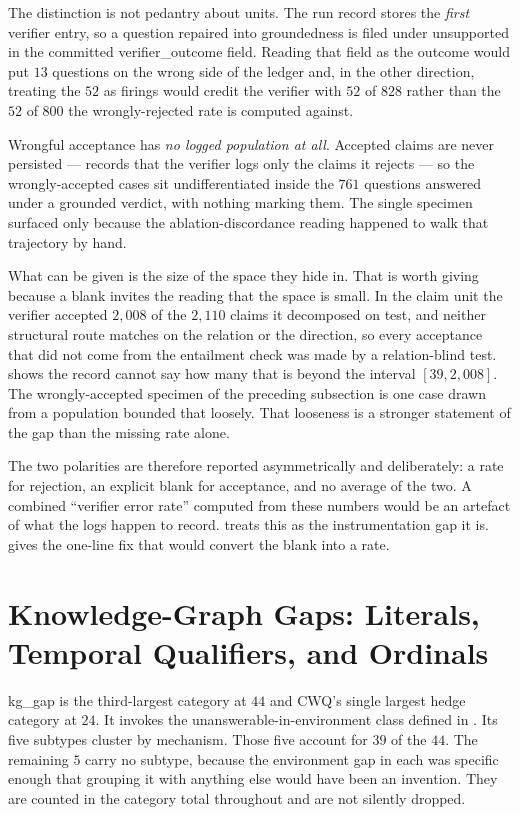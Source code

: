 The distinction is not pedantry about units. The run record stores the
\emph{first} verifier entry, so a question repaired into groundedness is filed
under \textsf{unsupported} in the committed \textsf{verifier\_outcome} field.
Reading that field as the outcome would put $13$ questions on the wrong side of
the ledger and, in the other direction, treating the $52$ as firings would
credit the verifier with $52$ of $828$ rather than the $52$ of $800$ the
wrongly-rejected rate is computed against.

Wrongful acceptance has \emph{no logged population at all}. Accepted claims are
never persisted ---  records that the verifier logs
only the claims it rejects --- so the wrongly-accepted cases sit
undifferentiated inside the $761$ questions answered under a grounded verdict,
with nothing marking them. The single specimen surfaced only because the
ablation-discordance reading happened to walk that trajectory by hand.

What can be given is the size of the space they hide in. That is worth giving
because a blank invites the reading that the space is small. In the claim unit
the verifier accepted $2{,}008$ of the $2{,}110$ claims it decomposed on test,
and neither structural route matches on the relation or the direction, so every
acceptance that did not come from the entailment check was made by a
relation-blind test.  shows the record cannot say how
many that is beyond the interval $[39, 2{,}008]$. The wrongly-accepted specimen
of the preceding subsection is one case drawn from a population bounded that
loosely. That looseness is a stronger statement of the gap than the missing
rate alone.

The two polarities are therefore reported asymmetrically and deliberately: a
rate for rejection, an explicit blank for acceptance, and no average of the two.
A combined ``verifier error rate'' computed from these numbers would be an
artefact of what the logs happen to record.  treats this as
the instrumentation gap it is.  gives the one-line fix that
would convert the blank into a rate.

\section{Knowledge-Graph Gaps: Literals, Temporal Qualifiers, and
Ordinals}\label{sec:kg-gaps}

\textsf{kg\_gap} is the third-largest category at $44$ and CWQ's single largest
hedge category at $24$. It invokes the unanswerable-in-environment class defined
in . Its five subtypes cluster by mechanism. Those
five account for $39$ of the $44$. The remaining $5$ carry no subtype, because
the environment gap in each was specific enough that grouping it with anything
else would have been an invention. They are counted in the category total
throughout and are not silently dropped.

